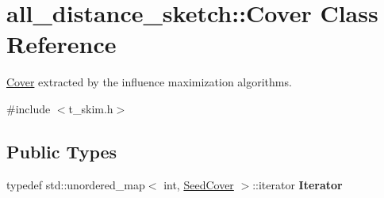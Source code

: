 \hypertarget{classall__distance__sketch_1_1Cover}{}\section{all\+\_\+distance\+\_\+sketch\+:\+:Cover Class Reference}
\label{classall__distance__sketch_1_1Cover}


\hyperlink{classall__distance__sketch_1_1Cover}{Cover} extracted by the influence maximization algorithms.  




{\ttfamily \#include $<$t\+\_\+skim.\+h$>$}

\subsection*{Public Types}
\begin{DoxyCompactItemize}
\item 
\hypertarget{classall__distance__sketch_1_1Cover_ad391c23943a5774b84ba6798e2655ab0}{}typedef std\+::unordered\+\_\+map$<$ int, \hyperlink{namespaceall__distance__sketch_a2c159e46ed1a101b68cb2b23a58c4129}{Seed\+Cover} $>$\+::iterator {\bfseries Iterator}\label{classall__distance__sketch_1_1Cover_ad391c23943a5774b84ba6798e2655ab0}

\end{DoxyCompactItemize}
